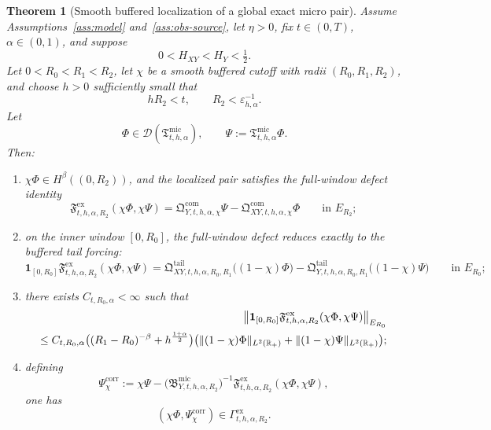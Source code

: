 \documentclass[11pt,a4paper]{amsart}
\theoremstyle{plain}
\newtheorem{theorem}{Theorem}[section]
\theoremstyle{definition}
\theoremstyle{remark}
\newcommand{\R}{\mathbb{R}}
\newcommand{\one}{\mathbf 1}
\begin{document}
\begin{theorem}[Smooth buffered localization of a global exact micro pair]
\label{thm:micro-smooth-buffer}
Assume Assumptions~\ref{ass:model} and~\ref{ass:obs-source}, let \(\eta>0\), fix \(t\in(0,T)\),
\(\alpha\in(0,1)\), and suppose
\[
0<H_{XY}<H_Y<\tfrac12.
\]
Let \(0<R_0<R_1<R_2\), let \(\chi\) be a smooth buffered cutoff with radii
\((R_0,R_1,R_2)\), and choose \(h>0\) sufficiently small that
\[
hR_2<t,
\qquad
R_2<\varepsilon_{h,\alpha}^{-1}.
\]
Let
\[
\Phi\in\mathcal D(\mathfrak T_{t,h,\alpha}^{\mathrm{mic}}),
\qquad
\Psi:=\mathfrak T_{t,h,\alpha}^{\mathrm{mic}}\Phi.
\]
Then:
\begin{enumerate}[label=(\roman*)]
\item \(\chi\Phi\in H^\beta((0,R_2))\), and the localized pair satisfies the full-window defect
identity
\begin{equation}\label{eq:micro-smooth-buffer-full}
\mathfrak F_{t,h,\alpha,R_2}^{\mathrm{ex}}(\chi\Phi,\chi\Psi)
=
\mathfrak Q_{Y,t,h,\alpha,\chi}^{\mathrm{com}}\Psi
-
\mathfrak Q_{XY,t,h,\alpha,\chi}^{\mathrm{com}}\Phi
\qquad\text{in }E_{R_2};
\end{equation}
\item on the inner window \([0,R_0]\), the full-window defect reduces exactly to the buffered tail
forcing:
\begin{equation}\label{eq:micro-smooth-buffer-inner}
\one_{[0,R_0]}
\mathfrak F_{t,h,\alpha,R_2}^{\mathrm{ex}}(\chi\Phi,\chi\Psi)
=
\mathfrak Q_{XY,t,h,\alpha,R_0,R_1}^{\mathrm{tail}}
\bigl((1-\chi)\Phi\bigr)
-
\mathfrak Q_{Y,t,h,\alpha,R_0,R_1}^{\mathrm{tail}}
\bigl((1-\chi)\Psi\bigr)
\qquad\text{in }E_{R_0};
\end{equation}
\item there exists \(C_{t,R_0,\alpha}<\infty\) such that
\begin{align}
\left\|
\one_{[0,R_0]}
\mathfrak F_{t,h,\alpha,R_2}^{\mathrm{ex}}(\chi\Phi,\chi\Psi)
\right\|_{E_{R_0}}
\notag\\
\le
C_{t,R_0,\alpha}
\bigl((R_1-R_0)^{-\beta}+h^{\frac{1+\alpha}{2}}\bigr)
\bigl(\|(1-\chi)\Phi\|_{L^2(\R_+)}+\|(1-\chi)\Psi\|_{L^2(\R_+)}\bigr);
\label{eq:micro-smooth-buffer-bound}
\end{align}
\item defining
\begin{equation}\label{eq:micro-smooth-buffer-corrected}
\Psi_\chi^{\mathrm{corr}}
:=
\chi\Psi
-
\bigl(
\mathfrak B_{Y,t,h,\alpha,R_2}^{\mathrm{mic}}
\bigr)^{-1}
\mathfrak F_{t,h,\alpha,R_2}^{\mathrm{ex}}(\chi\Phi,\chi\Psi),
\end{equation}
one has
\[
(\chi\Phi,\Psi_\chi^{\mathrm{corr}})
\in
\Gamma_{t,h,\alpha,R_2}^{\mathrm{ex}}.
\]
\end{enumerate}
\end{theorem}
\end{document}
